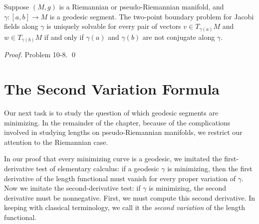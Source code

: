 \begin{proposition}
\label{prop:two-point-boundary-problem}

Suppose $(M, g)$ is a Riemannian or pseudo-Riemannian manifold, and $\gamma: [a, b] \to M$ is a geodesic segment. The two-point boundary problem for Jacobi fields along $\gamma$ is uniquely solvable for every pair of vectors $v \in T_{\gamma(a)} M$ and $w \in T_{\gamma(b)} M$ if and only if $\gamma(a)$ and $\gamma(b)$ are not conjugate along $\gamma$.

\textit{Proof.} Problem 10-8. \qed
\end{proposition}

\section{The Second Variation Formula}

Our next task is to study the question of which geodesic segments are minimizing. In the remainder of the chapter, because of the complications involved in studying lengths on pseudo-Riemannian manifolds, we restrict our attention to the Riemannian case.

In our proof that every minimizing curve is a geodesic, we imitated the first-derivative test of elementary calculus: if a geodesic $\gamma$ is minimizing, then the first derivative of the length functional must vanish for every proper variation of $\gamma$. Now we imitate the second-derivative test: if $\gamma$ is minimizing, the second derivative must be nonnegative. First, we must compute this second derivative. In keeping with classical terminology, we call it the \emph{second variation} of the length functional.

